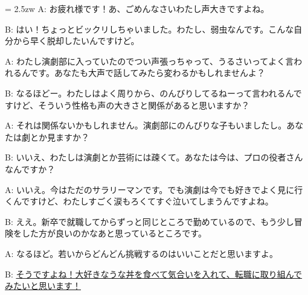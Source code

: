 \documentclass[11pt]{amsart}
\title{}
\author{}
\newenvironment{hangall}[1]{\hangindent = 2.5zw\everypar{\hangindent = 2.5zw}}{}
\begin{document}
\maketitle
\begin{hangall}{}%
A: お疲れ様です！あ、ごめんなさいわたし声大きですよね。

B: はい！ちょっとビックリしちゃいました。わたし、弱虫なんです。こんな自分から早く脱却したいんですけど。

A: わたし演劇部に入っていたのでつい声張っちゃって、うるさいってよく言われるんです。あなたも大声で話してみたら変わるかもしれませんよ？

B: なるほどー。わたしはよく周りから、のんびりしてるねーって言われるんですけど、そういう性格も声の大きさと関係があると思いますか？

A: それは関係ないかもしれません。演劇部にのんびりな子もいましたし。あなたは劇とか見ますか？

B: いいえ、わたしは演劇とか芸術には疎くて。あなたは今は、プロの役者さんなんですか？

A: いいえ。今はただのサラリーマンです。でも演劇は今でも好きでよく見に行くんですけど、わたしすごく涙もろくてすぐ泣いてしまうんですよね。

B: ええ。新卒で就職してからずっと同じところで勤めているので、もう少し冒険をした方が良いのかなあと思っているところです。

A: なるほど。若いからどんどん挑戦するのはいいことだと思いますよ。

B: \ul{そうですよね！大好きなうな丼を食べて気合いを入れて、転職に取り組んでみたいと思います！}\end{hangall}
\end{document}
